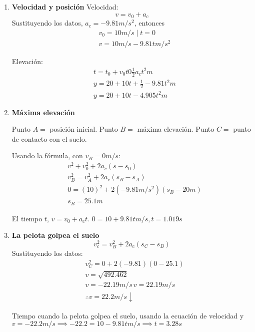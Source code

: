 \begin{enumerate}
    \item \textbf{Velocidad y posición}
    Velocidad:
\begin{equation*}
    v=v_0+a_c
\end{equation*}
Sustituyendo los datos, $a_c=-9.81m/s^2$, entonces
\begin{align*}
    &v_0=10m/s\mid t=0\\
    &v=10 m/s-9.81tm/s^2
\end{align*}

Elevación: 
\begin{align*}
    &t=t_0+v_0t0\frac{1}{2}a_ct^2m\\
    &y=20+10t+\frac{1}{2}-9.81t^2m\\
    &y=20+10t-4.905t^2m
\end{align*}
    \item \textbf{Máxima elevación}
    
    Punto $A=$ posición inicial. Punto $B=$ máxima elevación. Punto $C=$ punto de contacto con el suelo.

Usando la fórmula, con $v_B=0m/s$: 
\begin{align*}
    &v^2+v_0^2+2a_c\left(s-s_0\right)\\
    &v_B^2=v_A^2+2a_c\left(s_B-s_A\right)\\
    &0=\left(10\right)^2+2\left(-9.81m/s^2\right)\left(s_B-20m\right)\\
    &s_B=25.1m
\end{align*}

El tiempo $t$, $v=v_0+a_ct$. $0=10+9.81tm/s,t=1.019s$

\item \textbf{La pelota golpea el suelo}
\begin{equation*}
    v_c^2=v_B^2+2a_c\left(s_C-s_B\right)
\end{equation*}
Sustituyendo los datos: 
\begin{align*}
    &v_C^2=0+2(-9.81)(0-25.1)\\
    &v=\sqrt{492.462}\\
    &v=-22.19m/s\, v=22.19m/s\\
    &\therefore v=22.2m/s\downarrow
\end{align*}

Tiempo cuando la pelota golpea el suelo, usando la ecuación de velocidad y $v=-22.2m/s\implies -22.2=10-9.81tm/s\implies t=3.28s$
\end{enumerate}

